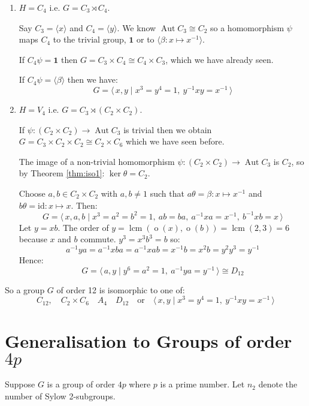 \documentclass[a4paper, oneside, 12pt, final]{article}
\theoremstyle{definition}
\DeclareMathOperator{\Aut}{Aut}
\DeclareMathOperator{\order}{o}
\DeclareMathOperator{\lcm}{lcm}
\begin{document}
\begin{enumerate}
    \item \(H = C_4\) i.e. \(G = C_3 \rtimes C_4\).

        Say \(C_3 = \langle x \rangle\) and \(C_4 = \langle y \rangle\).
        We know \(\Aut{C_3} \cong C_2\) so a homomorphism \(\psi\) maps \(C_4\)
        to the trivial group, \(\bm{1}\) or to \(\langle \beta:x \mapsto x^{-1}
        \rangle\).

        If \(C_4\psi = \bm{1}\) then \(G = C_3 \times C_4 \cong C_4 \times
        C_3\), which we have already seen.

        If \(C_4\psi = \langle \beta \rangle\) then we have:
        \[G = \langle\, x, y \mid x^3 = y^4 = 1,\ y^{-1}xy = x^{-1}\,\rangle\]

    \item \(H = V_4\) i.e. \(G = C_3 \rtimes (C_2 \times C_2)\).

        If \(\psi:(C_2 \times C_2) \to \Aut{C_3}\) is trivial then we obtain
        \(G = C_3 \times C_2 \times C_2 \cong C_2 \times C_6\) which we have
        seen before.

        The image of a non-trivial homomorphism \(\psi:(C_2 \times C_2) \to
        \Aut{C_3}\) is \(C_2\), so by Theorem \ref{thm:iso1}: \(\ker{\theta} =
        C_2\).

        Choose \(a, b \in C_2 \times C_2\) with \(a, b \neq 1\) such that
        \(a\theta = \beta:x \mapsto x^{-1}\) and \(b\theta = \text{id}:x
        \mapsto x\).
        Then:
        \[G = \langle\, x, a, b \mid x^3 = a^2 = b^2 = 1,\ ab = ba,\ a^{-1}xa =
        x^{-1},\ b^{-1}xb = x\,\rangle\]
        Let \(y = xb\).
        The order of \(y = \lcm{(\order{(x)}, \order{(b)})} = \lcm{(2, 3)} =
        6\) because \(x\) and \(b\) commute.
        \(y^3 = x^3b^3 = b\) so:
        \[ a^{-1}ya = a^{-1}xba = a^{-1}xab = x^{-1}b = x^2b = y^2y^3 = y^{-1}\]
        Hence:
        \[G = \langle\, a, y \mid y^6 = a^2 = 1,\ a^{-1}ya = y^{-1}\,\rangle
        \cong D_{12}\]
\end{enumerate}

So a group \(G\) of order 12 is isomorphic to one of:
\[
    C_{12}, \quad%
    C_2 \times C_6 \quad%
    A_4 \quad%
    D_{12} \quad \text{or} \quad%
    \langle\, x, y \mid x^3 = y^4 = 1,\ y^{-1}xy = x^{-1}\,\rangle
\]

\section{Generalisation to Groups of order \(4p\)}
Suppose \(G\) is a group of order \(4p\) where \(p\) is a prime number.
Let \(n_2\) denote the number of Sylow 2-subgroups.
\end{document}
